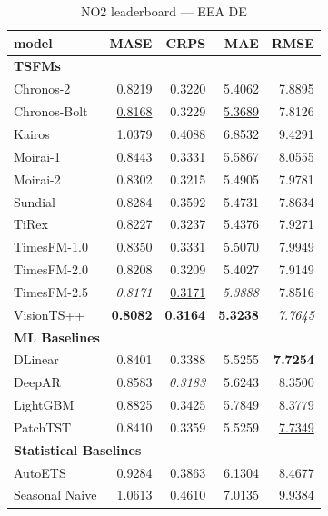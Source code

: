 \begin{table}[H]
\caption{NO2 leaderboard --- EEA DE}
\centering
\begin{small}
\begin{tabular}{lrrrr}
\toprule
model & MASE & CRPS & MAE & RMSE \\
\midrule
\multicolumn{5}{l}{\textbf{TSFMs}} \\
Chronos-2 & 0.8219 & 0.3220 & 5.4062 & 7.8895 \\
Chronos-Bolt & \underline{0.8168} & 0.3229 & \underline{5.3689} & 7.8126 \\
Kairos & 1.0379 & 0.4088 & 6.8532 & 9.4291 \\
Moirai-1 & 0.8443 & 0.3331 & 5.5867 & 8.0555 \\
Moirai-2 & 0.8302 & 0.3215 & 5.4905 & 7.9781 \\
Sundial & 0.8284 & 0.3592 & 5.4731 & 7.8634 \\
TiRex & 0.8227 & 0.3237 & 5.4376 & 7.9271 \\
TimesFM-1.0 & 0.8350 & 0.3331 & 5.5070 & 7.9949 \\
TimesFM-2.0 & 0.8208 & 0.3209 & 5.4027 & 7.9149 \\
TimesFM-2.5 & \textit{0.8171} & \underline{0.3171} & \textit{5.3888} & 7.8516 \\
VisionTS++ & \textbf{0.8082} & \textbf{0.3164} & \textbf{5.3238} & \textit{7.7645} \\
\midrule
\multicolumn{5}{l}{\textbf{ML Baselines}} \\
DLinear & 0.8401 & 0.3388 & 5.5255 & \textbf{7.7254} \\
DeepAR & 0.8583 & \textit{0.3183} & 5.6243 & 8.3500 \\
LightGBM & 0.8825 & 0.3425 & 5.7849 & 8.3779 \\
PatchTST & 0.8410 & 0.3359 & 5.5259 & \underline{7.7349} \\
\midrule
\multicolumn{5}{l}{\textbf{Statistical Baselines}} \\
AutoETS & 0.9284 & 0.3863 & 6.1304 & 8.4677 \\
Seasonal Naive & 1.0613 & 0.4610 & 7.0135 & 9.9384 \\
\bottomrule
\end{tabular}
\end{small}
\end{table}